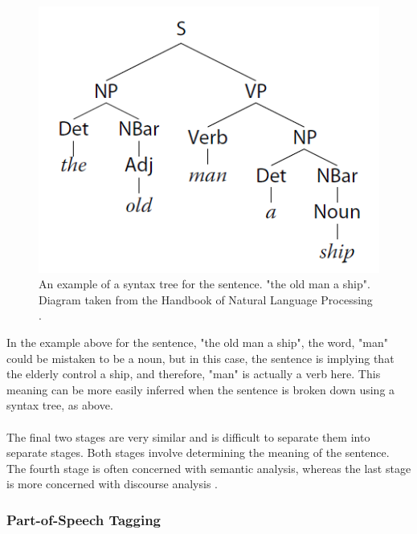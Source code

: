 \documentclass[12pt]{article}
\begin{document}
\begin{center}
\begin{figure}[H]
\begin{center}
  \includegraphics[scale=1]{syntax-tree.png}
  \caption{An example of a syntax tree for the sentence. "the old man a ship". Diagram taken from the Handbook of Natural Language Processing  \cite{RefWorks:40}.}
  \end{center}
\end{figure}
\end{center}

In the example above for the sentence, "the old man a ship", the word, "man" could be mistaken to be a noun, but in this case, the sentence is implying that the elderly control a ship, and therefore, "man" is actually a verb here. This meaning can be more easily inferred when the sentence is broken down using a syntax tree, as above.
\\
\\
The final two stages are very similar and is difficult to separate them into separate stages. Both stages involve determining the meaning of the sentence. The fourth stage is often concerned with semantic analysis, whereas the last stage is more concerned with discourse analysis \cite{RefWorks:39}.

\subsubsection{Part-of-Speech Tagging}
\end{document}
